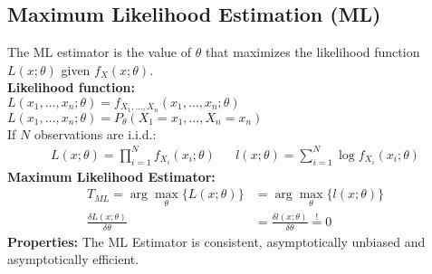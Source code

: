 \begin{mdframed}[style=eqbox]
  \subsection{Maximum Likelihood Estimation (ML)}
  The ML estimator is the value of $\theta$ that maximizes the likelihood function $L(x;\theta)$ given $f_X(x; \theta)$.\\[0.25em]
  \textbf{Likelihood function:}\\
  $L(x_1, \ldots, x_n; \theta) = f_{X_1, \ldots, X_n}(x_1, \ldots, x_n; \theta)$\\
  $L(x_1, \ldots, x_n; \theta) = P_\theta(X_1 = x_1, \ldots, X_n = x_n)$\\[0.5em]
  If $N$ observations are i.i.d.:
  \vspace*{-4pt}
  \begin{align*}
    L(x;\theta) = \prod_{i=1}^N f_{X_i}(x_i; \theta) && l(x;\theta) = \sum_{i=1}^N \log f_{X_i}(x_i; \theta)
  \end{align*}
  \textbf{Maximum Likelihood Estimator:}
  \vspace*{-4pt}
  \begin{align*}
    T_{ML} = \arg \max_\theta \{ L(x;\theta) \} &= \arg\max_\theta \{ l(x;\theta)\}\\
    \frac{\delta L(x;\theta)}{\delta \theta} &= \frac{\delta l(x;\theta)}{\delta \theta} \overset{!}{ =} 0
  \end{align*}
  \textbf{Properties:}
  The ML Estimator is consistent, asymptotically unbiased and asymptotically efficient.
\end{mdframed}
\newpage

